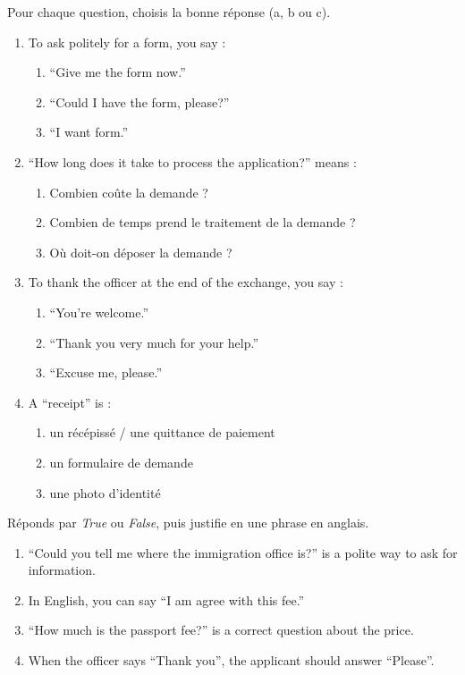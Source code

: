 \documentclass[11pt]{article}
\begin{document}
\begin{exercice}
Pour chaque question, choisis la bonne réponse (a, b ou c).
\begin{enumerate}
\item To ask politely for a form, you say :
\begin{enumerate}
\item “Give me the form now.”
\item “Could I have the form, please?”
\item “I want form.”
\end{enumerate}
\item “How long does it take to process the application?” means :
\begin{enumerate}
\item Combien coûte la demande ?
\item Combien de temps prend le traitement de la demande ?
\item Où doit-on déposer la demande ?
\end{enumerate}
\item To thank the officer at the end of the exchange, you say :
\begin{enumerate}
\item “You're welcome.”
\item “Thank you very much for your help.”
\item “Excuse me, please.”
\end{enumerate}
\item A “receipt” is :
\begin{enumerate}
\item un récépissé / une quittance de paiement
\item un formulaire de demande
\item une photo d'identité
\end{enumerate}
\end{enumerate}
\end{exercice}

\begin{exercice}
Réponds par \emph{True} ou \emph{False}, puis justifie en une phrase en anglais.
\begin{enumerate}
\item “Could you tell me where the immigration office is?” is a polite way to ask for information.
\item In English, you can say “I am agree with this fee.”
\item “How much is the passport fee?” is a correct question about the price.
\item When the officer says “Thank you”, the applicant should answer “Please”.
\end{enumerate}
\end{exercice}
\end{document}

